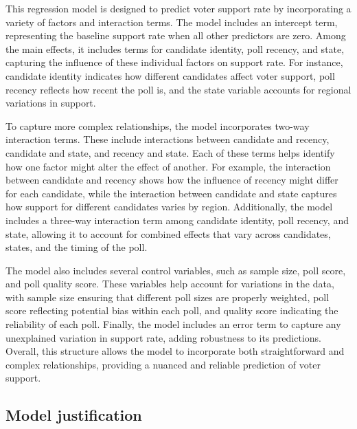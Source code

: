 \documentclass[
  letterpaper,
  DIV=11,
  numbers=noendperiod]{scrartcl}
\begin{document}
This regression model is designed to predict voter support rate by
incorporating a variety of factors and interaction terms. The model
includes an intercept term, representing the baseline support rate when
all other predictors are zero. Among the main effects, it includes terms
for candidate identity, poll recency, and state, capturing the influence
of these individual factors on support rate. For instance, candidate
identity indicates how different candidates affect voter support, poll
recency reflects how recent the poll is, and the state variable accounts
for regional variations in support.

To capture more complex relationships, the model incorporates two-way
interaction terms. These include interactions between candidate and
recency, candidate and state, and recency and state. Each of these terms
helps identify how one factor might alter the effect of another. For
example, the interaction between candidate and recency shows how the
influence of recency might differ for each candidate, while the
interaction between candidate and state captures how support for
different candidates varies by region. Additionally, the model includes
a three-way interaction term among candidate identity, poll recency, and
state, allowing it to account for combined effects that vary across
candidates, states, and the timing of the poll.

The model also includes several control variables, such as sample size,
poll score, and poll quality score. These variables help account for
variations in the data, with sample size ensuring that different poll
sizes are properly weighted, poll score reflecting potential bias within
each poll, and quality score indicating the reliability of each poll.
Finally, the model includes an error term to capture any unexplained
variation in support rate, adding robustness to its predictions.
Overall, this structure allows the model to incorporate both
straightforward and complex relationships, providing a nuanced and
reliable prediction of voter support.

\hypertarget{model-justification}{%
\subsection{Model justification}\label{model-justification}}
\end{document}
